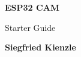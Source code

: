 \begin{titlepage}
   \begin{center}
       \vspace*{1cm}

       {\fontsize{50}{60}\selectfont \textbf{ESP32 CAM}}

       \vspace{0.5cm}
        {\fontsize{20}{30}\selectfont Starter Guide}
            
       \vspace{1.5cm}

       \textbf{Siegfried Kienzle}

       \vfill
            
      
            
   \end{center}
\end{titlepage}